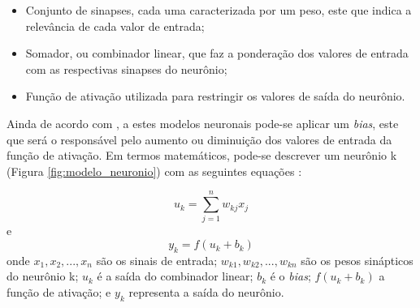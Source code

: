\begin{itemize}
	\item Conjunto de sinapses, cada uma caracterizada por um peso, este que indica a relevância de cada valor de entrada;
	\item Somador, ou combinador linear, que faz a ponderação dos valores de entrada com as respectivas sinapses do neurônio;
	\item Função de ativação utilizada para restringir os valores de saída do neurônio.
\end{itemize}

\par Ainda de acordo com , a estes modelos neuronais pode-se aplicar um \textit{bias}, este que será o responsável pelo aumento ou diminuição dos valores de entrada da função de ativação. Em termos matemáticos, pode-se descrever um neurônio k (Figura \ref{fig:modelo_neuronio}) com as seguintes equações \cite{Haykin2001}:

\begin{equation}
	u_{k} = \sum_{j=1}^{n} w_{kj} x_{j}
\end{equation}
e
\begin{equation}
	y_{k} = f(u_{k} + b_{k})	
\end{equation}
onde $ x_{1}, x_{2}, ..., x_{n} $ são os sinais de entrada; $ w_{k1}, w_{k2}, ..., w_{kn} $ são os pesos sinápticos do neurônio k; $ u_{k} $ é a saída do combinador linear; $ b_{k} $ é o \textit{bias}; $ f(u_{k} + b_{k}) $ a função de ativação; e $ y_{k} $ representa a saída do neurônio.

